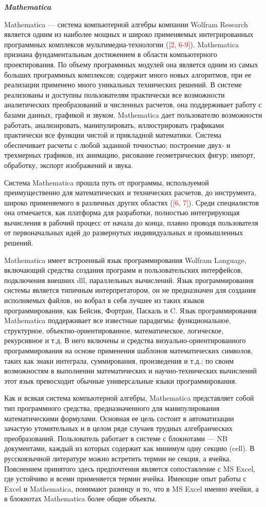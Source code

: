 \textbf{\textit{Mathematica}}

Mathematica --- система компьютерной алгебры компании Wolfram Research является одним из наиболее мощных и широко применяемых интегрированных программных комплексов мультимедиа-технологии (\textcolor{red}{[2, 6-9]}). Mathematica признана фундаментальным достижением в области компьютерного проектирования. По объему программных модулей она является одним из самых больших программных комплексов; содержит много новых алгоритмов, при ее реализации применено много уникальных технических решений. В системе реализованы и доступны пользователям практически все возможности аналитических преобразований и численных расчетов, она поддерживает работу с базами данных, графикой и звуком. Mathematica дает пользователю возможности работать, анализировать, манипулировать, иллюстрировать графиками практически все функции чистой и прикладной математики. Система обеспечивает расчеты с любой заданной точностью; построение двух- и трехмерных графиков, их анимацию, рисование геометрических фигур; импорт, обработку, экспорт изображений и звука.

Система Mathematica прошла путь от программы, используемой преимущественно для математических и технических расчетов, до инструмента, широко применяемого в различных других областях (\textcolor{red}{[6, 7]}). Среди специалистов она отмечается, как платформа для разработки, полностью интегрирующая вычисления в рабочий процесс от начала до конца, плавно проводя пользователя от первоначальных идей до развернутых индивидуальных и промышленных решений.

Mathematica имеет встроенный язык программирования Wolfram Language, включающий средства создания программ и пользовательских интерфейсов, подключения внешних dll, параллельных вычислений. Язык программирования системы является типичным интерпретатором, он не предназначен для создания исполняемых файлов, но вобрал в себя лучшее из таких языков программирования, как Бейсик, Фортран, Паскаль и C. Язык программирования Mathematica поддерживает все известные парадигмы: функциональное, структурное, объектно-ориентированное, математическое, логическое, рекурсивное и т.д. В него включены и средства визуально-ориентированного программирования на основе применения шаблонов математических символов, таких как знаки интеграла, суммирования, произведения и т.д.; по своим возможностям в выполнении математических и научно-технических вычислений этот язык превосходит обычные универсальные языки программирования.

Как и всякая система компьютерной алгебры, Mathematica представляет собой тип программного средства, предназначенного для манипулирования математическими формулами. Основная ее цель состоит в автоматизации зачастую утомительных и в целом ряде случаев трудных алгебраических преобразований. Пользователь работает в системе с блокнотами --- NB документами, каждый из которых содержит как минимум одну секцию (cell). В русскоязычной литературе можно встретить термин не секция, а ячейка. Пояснением принятого здесь предпочтения является сопоставление с MS Excel, где устойчиво и всеми применяется термин ячейка. Имеющие опыт работы с Excel и Mathematica, понимают разницу и то, что в MS Excel именно ячейки, а в блокнотах Mathematica более общие объекты. 

